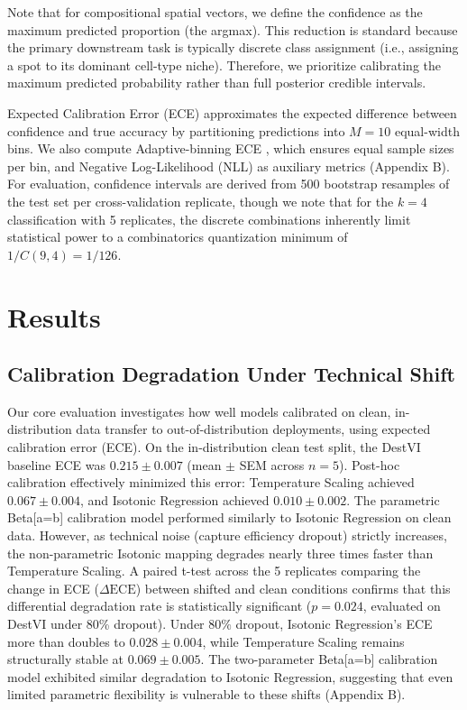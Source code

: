 \documentclass{jmlr} %
\begin{document}
Note that for compositional spatial vectors, we define the confidence as the maximum predicted proportion (the argmax). This reduction is standard because the primary downstream task is typically discrete class assignment (i.e., assigning a spot to its dominant cell-type niche). Therefore, we prioritize calibrating the maximum predicted probability rather than full posterior credible intervals.

Expected Calibration Error (ECE) approximates the expected difference between confidence and true accuracy by partitioning predictions into $M=10$ equal-width bins. We also compute Adaptive-binning ECE \citep{nixon2019measuring}, which ensures equal sample sizes per bin, and Negative Log-Likelihood (NLL) as auxiliary metrics (Appendix B). For evaluation, confidence intervals are derived from 500 bootstrap resamples of the test set per cross-validation replicate, though we note that for the $k=4$ classification with 5 replicates, the discrete combinations inherently limit statistical power to a combinatorics quantization minimum of $1/C(9,4) = 1/126$.

\section{Results}
\label{sec:results}
\subsection{Calibration Degradation Under Technical Shift}
Our core evaluation investigates how well models calibrated on clean, in-distribution data transfer to out-of-distribution deployments, using expected calibration error (ECE). On the in-distribution clean test split, the DestVI baseline ECE was $0.215 \pm 0.007$ (mean $\pm$ SEM across $n=5$). Post-hoc calibration effectively minimized this error: Temperature Scaling achieved $0.067 \pm 0.004$, and Isotonic Regression achieved $0.010 \pm 0.002$. The parametric Beta[a=b] calibration model performed similarly to Isotonic Regression on clean data. However, as technical noise (capture efficiency dropout) strictly increases, the non-parametric Isotonic mapping degrades nearly three times faster than Temperature Scaling. A paired t-test across the 5 replicates comparing the change in ECE ($\Delta \text{ECE}$) between shifted and clean conditions confirms that this differential degradation rate is statistically significant ($p = 0.024$, evaluated on DestVI under 80\% dropout). Under $80\%$ dropout, Isotonic Regression's ECE more than doubles to $0.028 \pm 0.004$, while Temperature Scaling remains structurally stable at $0.069 \pm 0.005$. The two-parameter Beta[a=b] calibration model exhibited similar degradation to Isotonic Regression, suggesting that even limited parametric flexibility is vulnerable to these shifts (Appendix B).
\end{document}
